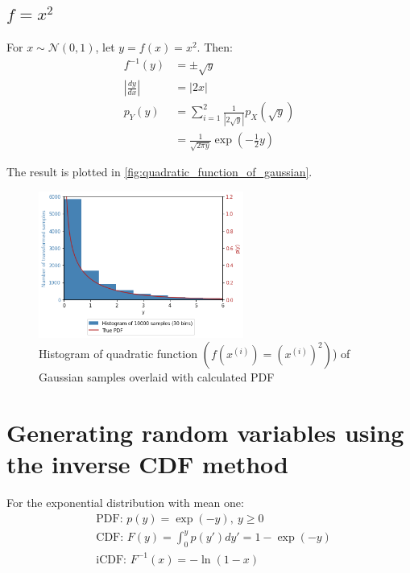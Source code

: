 \documentclass[a4paper]{article}
\begin{document}

\subsection{$f = x^2$}
For $x \sim \mathcal{N}(0, 1)$, let $y = f(x) = x ^ 2$. Then:
\begin{align*}
    f^{-1}(y) &= \pm \sqrt{y} \\
    \left|\frac{dy}{dx}\right| &= |2x| \\
    p_Y(y) &= \sum_{i=1}^{2} \frac{1}{|2 \sqrt{y}|} p_X \left( \sqrt{y} \right) \\
    &= \frac{1}{\sqrt{2\pi y}} \exp{\left( -\frac{1}{2} y \right)}
\end{align*}

The result is plotted in \autoref{fig:quadratic_function_of_gaussian}.

\begin{figure}[h]
\centering
\includegraphics[width=0.6\textwidth]{figures/quadratic_function_of_gaussian.png}
\caption{Histogram of quadratic function $\left(f(x^{(i)}) = \left(x^{(i)}\right)^2\right)$) of Gaussian samples
overlaid with calculated PDF}
\label{fig:quadratic_function_of_gaussian}
\end{figure}


\section{Generating random variables using the inverse CDF method}

For the exponential distribution with mean one:
\begin{align*}
    & \text{PDF: } p(y) = \exp(-y), \ y \geq 0 \\
    & \text{CDF: } F(y) = \int_0^y p(y') dy' = 1 - \exp(-y) \\
    & \text{iCDF: } F^{-1}(x) = -\ln(1 - x)
\end{align*}
\end{document}
